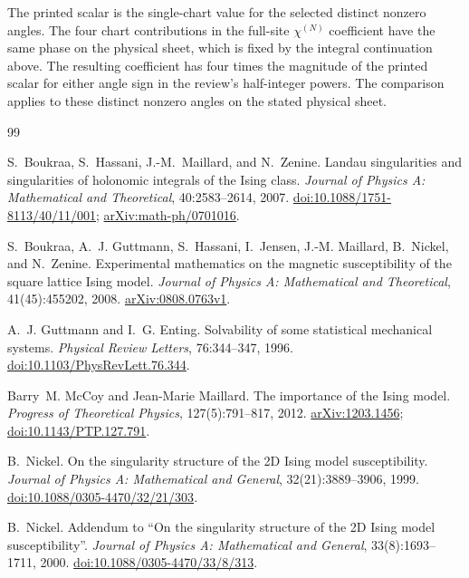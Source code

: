 \documentclass[11pt]{article}
\numberwithin{equation}{section}
\theoremstyle{definition}
\begin{document}
The printed scalar is the single-chart value for the selected
distinct nonzero angles. The four chart contributions in the
full-site \(\chi^{(N)}\) coefficient have the same phase on the
physical sheet, which is fixed by the integral continuation above.
The resulting coefficient has four times the magnitude of the
printed scalar for either angle sign in the review's half-integer
powers. The comparison applies to these distinct nonzero angles on
the stated physical sheet.



\clearpage
\begin{thebibliography}{99}

S.~Boukraa, S.~Hassani, J.-M.~Maillard, and N.~Zenine.
\newblock Landau singularities and singularities of holonomic integrals
of the Ising class.
\newblock \emph{Journal of Physics A: Mathematical and Theoretical},
40:2583--2614, 2007.
\newblock \href{https://doi.org/10.1088/1751-8113/40/11/001}{doi:10.1088/1751-8113/40/11/001};
\href{https://arxiv.org/abs/math-ph/0701016}{arXiv:math-ph/0701016}.

S.~Boukraa, A.~J. Guttmann, S.~Hassani, I.~Jensen, J.-M. Maillard,
B.~Nickel, and N.~Zenine.
\newblock Experimental mathematics on the magnetic susceptibility of the
square lattice {Ising} model.
\newblock \emph{Journal of Physics A: Mathematical and Theoretical},
41(45):455202, 2008.
\newblock \href{https://arxiv.org/abs/0808.0763v1}{arXiv:0808.0763v1}.

A.~J. Guttmann and I.~G. Enting.
\newblock Solvability of some statistical mechanical systems.
\newblock \emph{Physical Review Letters}, 76:344--347, 1996.
\newblock \href{https://doi.org/10.1103/PhysRevLett.76.344}{doi:10.1103/PhysRevLett.76.344}.

Barry~M. McCoy and Jean-Marie Maillard.
\newblock The importance of the {Ising} model.
\newblock \emph{Progress of Theoretical Physics}, 127(5):791--817, 2012.
\newblock \href{https://arxiv.org/abs/1203.1456}{arXiv:1203.1456};
\href{https://doi.org/10.1143/PTP.127.791}{doi:10.1143/PTP.127.791}.

B.~Nickel.
\newblock On the singularity structure of the 2D {Ising} model susceptibility.
\newblock \emph{Journal of Physics A: Mathematical and General},
32(21):3889--3906, 1999.
\newblock \href{https://doi.org/10.1088/0305-4470/32/21/303}{doi:10.1088/0305-4470/32/21/303}.

B.~Nickel.
\newblock Addendum to ``On the singularity structure of the 2D {Ising}
model susceptibility''.
\newblock \emph{Journal of Physics A: Mathematical and General},
33(8):1693--1711, 2000.
\newblock \href{https://doi.org/10.1088/0305-4470/33/8/313}{doi:10.1088/0305-4470/33/8/313}.


\end{thebibliography}
\end{document}
